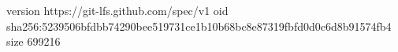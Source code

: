 version https://git-lfs.github.com/spec/v1
oid sha256:5239506bfdbb74290bee519731ce1b10b68bc8e87319fbfd0d0c6d8b91574fb4
size 699216
